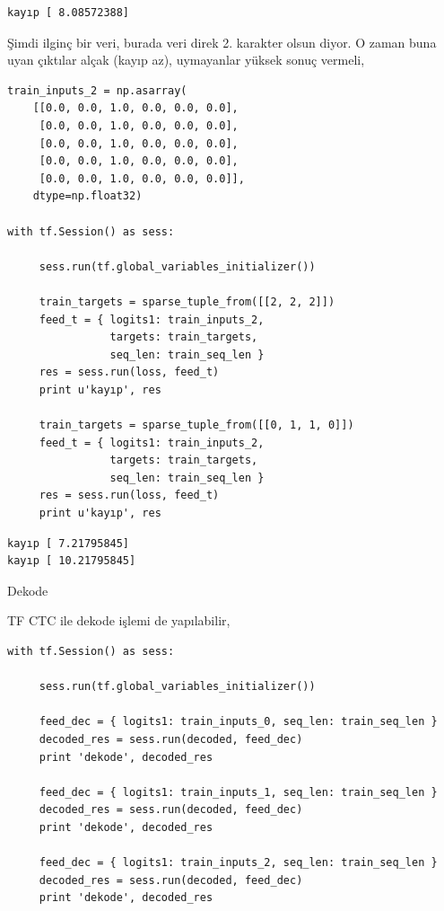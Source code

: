 \documentclass[12pt,fleqn]{article}\usepackage{../../common}
\begin{document}
\begin{verbatim}
kayıp [ 8.08572388]
\end{verbatim}

Şimdi ilginç bir veri, burada veri direk 2. karakter olsun diyor. O zaman
buna uyan çıktılar alçak (kayıp az), uymayanlar yüksek sonuç vermeli,

\begin{verbatim}
train_inputs_2 = np.asarray(
    [[0.0, 0.0, 1.0, 0.0, 0.0, 0.0],
     [0.0, 0.0, 1.0, 0.0, 0.0, 0.0],
     [0.0, 0.0, 1.0, 0.0, 0.0, 0.0],
     [0.0, 0.0, 1.0, 0.0, 0.0, 0.0],
     [0.0, 0.0, 1.0, 0.0, 0.0, 0.0]],
    dtype=np.float32)

with tf.Session() as sess:

     sess.run(tf.global_variables_initializer())

     train_targets = sparse_tuple_from([[2, 2, 2]]) 
     feed_t = { logits1: train_inputs_2, 
                targets: train_targets, 
                seq_len: train_seq_len }
     res = sess.run(loss, feed_t)     
     print u'kayıp', res

     train_targets = sparse_tuple_from([[0, 1, 1, 0]]) 
     feed_t = { logits1: train_inputs_2, 
                targets: train_targets, 
                seq_len: train_seq_len }
     res = sess.run(loss, feed_t)     
     print u'kayıp', res
\end{verbatim}

\begin{verbatim}
kayıp [ 7.21795845]
kayıp [ 10.21795845]
\end{verbatim}

Dekode

TF CTC ile dekode işlemi de yapılabilir,

\begin{verbatim}        
with tf.Session() as sess:

     sess.run(tf.global_variables_initializer())

     feed_dec = { logits1: train_inputs_0, seq_len: train_seq_len }
     decoded_res = sess.run(decoded, feed_dec)     
     print 'dekode', decoded_res
     
     feed_dec = { logits1: train_inputs_1, seq_len: train_seq_len }
     decoded_res = sess.run(decoded, feed_dec)     
     print 'dekode', decoded_res
     
     feed_dec = { logits1: train_inputs_2, seq_len: train_seq_len }
     decoded_res = sess.run(decoded, feed_dec)     
     print 'dekode', decoded_res
\end{verbatim}
\end{document}
